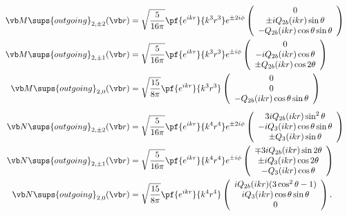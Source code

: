 \documentclass[letterpaper]{article}
\begin{document}
\begin{align*}
\\[5pt]
 \vb M\sups{outgoing}_{2,\pm 2}(\vb r)
  &=\sqrt\frac{5}{16\pi}\pf{e^{ikr}}{k^3 r^3} e^{\pm 2i\phi}
    \left(\begin{array}{c}
    0 				  \\
   \pm  iQ_{2b}(ikr)\sin\theta	  \\
    -Q_{2b}(ikr)\cos\theta\sin\theta
    \end{array}\right)
\\
 \vb M\sups{outgoing}_{2,\pm 1}(\vb r)
  &=\sqrt\frac{5}{16\pi}\pf{e^{ikr}}{k^3 r^3} e^{\pm i\phi}
    \left(\begin{array}{c}
    0                            \\
    -iQ_{2b}(ikr)\cos\theta  \\
    \pm Q_{2b}(ikr)\cos 2\theta
    \end{array}\right)
\\
 \vb M\sups{outgoing}_{2,0}(\vb r)
  &=\sqrt\frac{15}{8\pi}\pf{e^{ikr}}{k^3 r^3}
    \left(\begin{array}{c}
    0 \\ 
    0 \\ 
    -Q_{2b}(ikr)\cos \theta \sin\theta
    \end{array}\right)
\\[5pt]
 \vb N\sups{outgoing}_{2,\pm 2}(\vb r)
  &=\sqrt\frac{5}{16\pi}\pf{e^{ikr}}{k^4 r^4} e^{\pm 2i\phi}
    \left(\begin{array}{c}
   3iQ_{2b}(ikr) \sin^2 \theta                          \\
   -iQ_3(ikr) \cos\theta \sin\theta   \\
   \pm Q_3(ikr) \sin\theta 
    \end{array}\right)
\\
 \vb N\sups{outgoing}_{2,\pm 1}(\vb r)
  &=\sqrt\frac{5}{16\pi}\pf{e^{ikr}}{k^4 r^4} e^{\pm i\phi}
    \left(\begin{array}{c}
   \mp 3iQ_{2b}(ikr) \sin 2\theta               \\
   \pm iQ_3(ikr) \cos 2\theta  \\
   -Q_3(ikr) \cos\theta
    \end{array}\right)
\\
 \vb N\sups{outgoing}_{2,0}(\vb r)
  &=\sqrt\frac{15}{8\pi}\pf{e^{ikr}}{k^4 r^4}
    \left(\begin{array}{c}
   iQ_{2b}(ikr)(3\cos^2 \theta -1)                    \\
   iQ_3(ikr) \cos \theta \sin\theta \\
   0
    \end{array}\right).
\end{align*}
\end{document}
